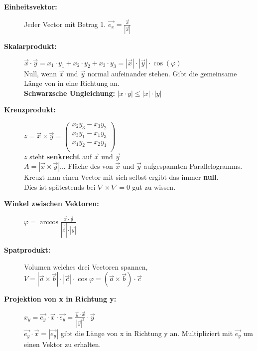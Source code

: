 \begin{description}
    \item [\textbf{Einheitsvektor:}] Jeder Vector mit Betrag 1. $\vec{e_x}=\frac{\vec{x}}{|\vec{x}|}$\\

    \item[\textbf{Skalarprodukt:}] $\vec x \cdot \vec{y} = x_1\cdot y_1 + x_2\cdot y_2 + x_3\cdot y_3 = |\vec{x}|\cdot|\vec{y}|\cdot \cos(\varphi)$\\
    Null, wenn $\vec x $ und $\vec y $ normal aufeinander stehen. Gibt die gemeinsame Länge von in eine  Richtung an.\\
    \textbf{Schwarzsche Ungleichung:} $|x\cdot y|\leq |x|\cdot |y|$\\
    
    \item[\textbf{Kreuzprodukt:}] $z = \vec x \times \vec y  = 
    \begin{pmatrix}
        x_2y_3-x_3y_2\\
        x_3y_1-x_1y_3\\
        x_1y_2-x_2y_1\\
    \end{pmatrix}$\\
    
    $z$ steht \textbf{senkrecht} auf $\vec x $ und $\vec y $\\
    $A = |\vec x \times \vec y |$... Fläche des von $\vec x $ und $\vec y $ aufgespannten Parallelogramms.\\
    Kreuzt man einen Vector mit sich selbst ergibt das immer \textbf{null}.\\
    Dies ist spätestends bei $\nabla \times \nabla = 0$ gut zu wissen.\\

    \item[\textbf{Winkel zwischen Vektoren:}]  $\varphi = \arccos \frac{\vec x \cdot \vec y }{|\vec{\vec x }|\cdot |\vec y |}$\\
    
    \item[\textbf{Spatprodukt:} ] Volumen welches drei Vectoren spannen, $V = |\vec a \times \vec b |\cdot |\vec c | \cdot \cos \varphi = (\vec a \times \vec b )\cdot \vec c $\\
    
    \item[\textbf{Projektion von x in Richtung y:}] $x_y=\vec{e_y}\cdot \vec{x} \cdot \vec{e_y}=\frac{\vec{y}\cdot \vec{x}}{|\vec{y}|^2} \cdot \vec{y}$\\
    $\vec{e_y}\cdot \vec{x} = |\vec{e_y}|$ gibt die Länge von x in Richtung y an. Multipliziert mit $\vec{e_y}$ um einen Vektor zu erhalten.
    

\end{description}
 